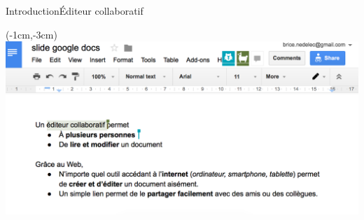 \begin{frame}{Introduction}{Éditeur collaboratif}
    
  
  \begin{textblock*}{\textwidth}(-1cm,-3cm) 
    \includegraphics[width=1.19\textwidth]{img/googledocs3.png}
  \end{textblock*}


\end{frame}
